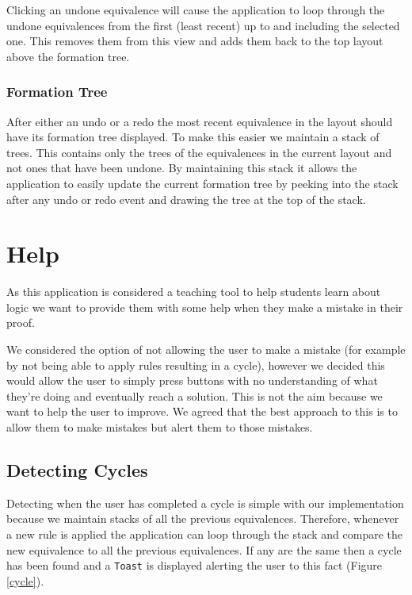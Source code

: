 \documentclass{report}
\begin{document}
Clicking an undone equivalence will cause the application to loop through the undone equivalences from the first (least recent) up to and including the selected one. This removes them from this view and adds them back to the top layout above the formation tree. 

\subsubsection{Formation Tree}

After either an undo or a redo the most recent equivalence in the layout should have its formation tree displayed. To make this easier we maintain a stack of trees. This contains only the trees of the equivalences in the current layout and not ones that have been undone. By maintaining this stack it allows the application to easily update the current formation tree by peeking into the stack after any undo or redo event and drawing the tree at the top of the stack.

\section{Help}

As this application is considered a teaching tool to help students learn about logic we want to provide them with some help when they make a mistake in their proof.

We considered the option of not allowing the user to make a mistake (for example by not being able to apply rules resulting in a cycle), however we decided this would allow the user to simply press buttons with no understanding of what they're doing and eventually reach a solution. This is not the aim because we want to help the user to improve. We agreed that the best approach to this is to allow them to make mistakes but alert them to those mistakes.

\subsection{Detecting Cycles}
\label{sub:detecting_cycles}

Detecting when the user has completed a cycle is simple with our implementation because we maintain stacks of all the previous equivalences. Therefore, whenever a new rule is applied the application can loop through the stack and compare the new equivalence to all the previous equivalences. If any are the same then a cycle has been found and a {\tt Toast} is displayed alerting the user to this fact (Figure \ref{cycle}).
\end{document}
